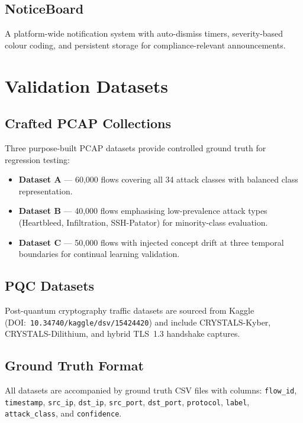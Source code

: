 \subsection{NoticeBoard}
A platform-wide notification system with auto-dismiss timers, severity-based
colour coding, and persistent storage for compliance-relevant announcements.

\section{Validation Datasets}
\label{sec:datasets}

\subsection{Crafted PCAP Collections}
Three purpose-built PCAP datasets provide controlled ground truth for
regression testing:
\begin{itemize}
  \item \textbf{Dataset A} --- 60,000 flows covering all 34 attack classes
        with balanced class representation.
  \item \textbf{Dataset B} --- 40,000 flows emphasising low-prevalence
        attack types (Heartbleed, Infiltration, SSH-Patator) for
        minority-class evaluation.
  \item \textbf{Dataset C} --- 50,000 flows with injected concept drift
        at three temporal boundaries for continual learning validation.
\end{itemize}

\subsection{PQC Datasets}
Post-quantum cryptography traffic datasets are sourced from Kaggle
(DOI:~\texttt{10.34740/kaggle/dsv/15424420}) and include CRYSTALS-Kyber,
CRYSTALS-Dilithium, and hybrid TLS~1.3 handshake captures.

\subsection{Ground Truth Format}
All datasets are accompanied by ground truth CSV files with columns:
\texttt{flow\_id}, \texttt{timestamp}, \texttt{src\_ip}, \texttt{dst\_ip},
\texttt{src\_port}, \texttt{dst\_port}, \texttt{protocol}, \texttt{label},
\texttt{attack\_class}, and \texttt{confidence}.

